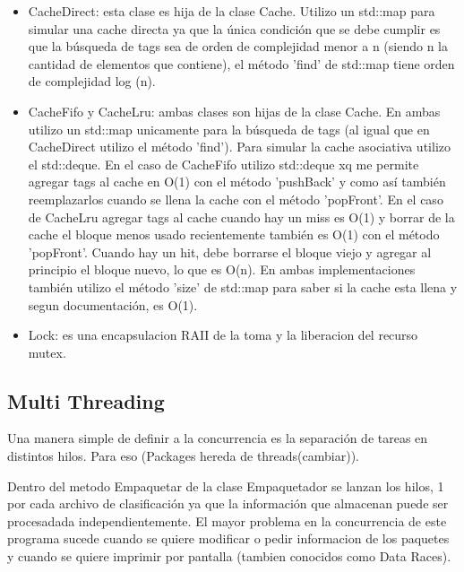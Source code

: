 \documentclass[a4paper,12pt]{report}
\begin{document}
\begin{itemize}
\item CacheDirect: esta clase es hija de la clase Cache. Utilizo un std::map para simular una cache directa ya que la \'unica condici\'on que se debe cumplir es que la b\'usqueda de tags sea de orden de complejidad menor a n (siendo n la cantidad de elementos que contiene), el m\'etodo 'find' de std::map tiene orden de complejidad log (n).

\item CacheFifo y CacheLru: ambas clases son hijas de la clase Cache. En ambas utilizo un std::map unicamente para la b\'usqueda de tags (al igual que en CacheDirect utilizo el m\'etodo 'find'). Para simular la cache asociativa utilizo el std::deque. En el caso de CacheFifo utilizo std::deque xq me permite agregar tags al cache en O(1) con el m\'etodo 'pushBack' y como as\'i tambi\'en reemplazarlos cuando se llena la cache con el m\'etodo 'popFront'. En el caso de CacheLru agregar tags al cache cuando hay un miss es O(1) y borrar de la cache el bloque menos usado recientemente tambi\'en es O(1) con el m\'etodo 'popFront'. Cuando hay un hit, debe borrarse el bloque viejo y agregar al principio el bloque nuevo, lo que es O(n). En ambas implementaciones tambi\'en utilizo el m\'etodo 'size' de std::map para saber si la cache esta llena y segun documentaci\'on, es O(1).
 
\item Lock: es una encapsulacion RAII de la toma y la liberacion del recurso mutex.


\end{itemize}


\subsection{Multi Threading}

Una manera simple de definir a la concurrencia es la separaci\'on de tareas en distintos hilos. Para eso (Packages hereda de threads(cambiar)). 

Dentro del metodo Empaquetar de la clase Empaquetador se lanzan los hilos, 1 por cada archivo de clasificaci\'on ya que la informaci\'on que almacenan puede ser procesadada independientemente. El mayor problema en la concurrencia de este programa sucede cuando se quiere modificar o pedir informacion de los paquetes y cuando se quiere imprimir por pantalla (tambien conocidos como Data Races). 
\end{document}
